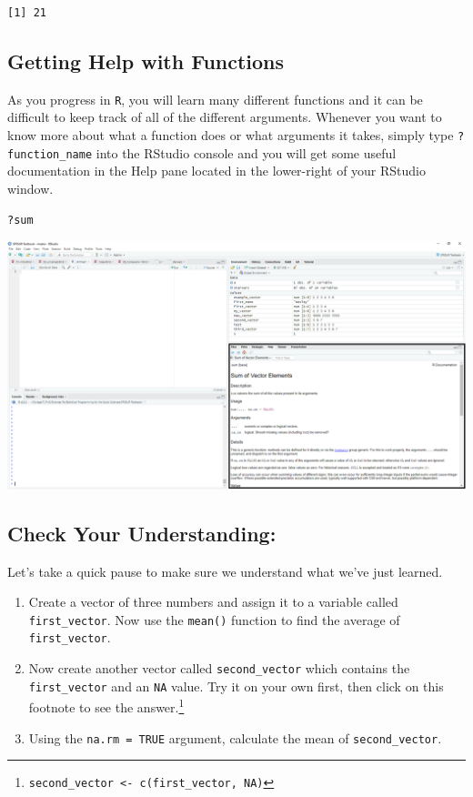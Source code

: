 \documentclass[
  letterpaper,
]{book}
\providecommand{\tightlist}{%
  \setlength{\itemsep}{0pt}\setlength{\parskip}{0pt}}\usepackage{longtable,booktabs,array}
\begin{document}
\begin{verbatim}
[1] 21
\end{verbatim}

\hypertarget{getting-help-with-functions}{%
\subsection{Getting Help with
Functions}\label{getting-help-with-functions}}

As you progress in \texttt{R}, you will learn many different functions
and it can be difficult to keep track of all of the different arguments.
Whenever you want to know more about what a function does or what
arguments it takes, simply type \texttt{?function\_name} into the
RStudio console and you will get some useful documentation in the Help
pane located in the lower-right of your RStudio window.

\begin{verbatim}
?sum
\end{verbatim}

\includegraphics{images/RStudio_Help Pane.PNG}

\hypertarget{check-your-understanding}{%
\subsection*{Check Your Understanding:}\label{check-your-understanding}}

Let's take a quick pause to make sure we understand what we've just
learned.

\begin{enumerate}
\def\labelenumi{\arabic{enumi}.}
\tightlist
\item
  Create a vector of three numbers and assign it to a variable called
  \texttt{first\_vector}. Now use the \texttt{mean()} function to find
  the average of \texttt{first\_vector}.
\item
  Now create another vector called \texttt{second\_vector} which
  contains the \texttt{first\_vector} and an \texttt{NA} value. Try it
  on your own first, then click on this footnote to see the
  answer.\footnote{\texttt{second\_vector\ \textless{}-\ c(first\_vector,\ NA)}}
\item
  Using the \texttt{na.rm\ =\ TRUE} argument, calculate the mean of
  \texttt{second\_vector}.
\end{enumerate}
\end{document}
